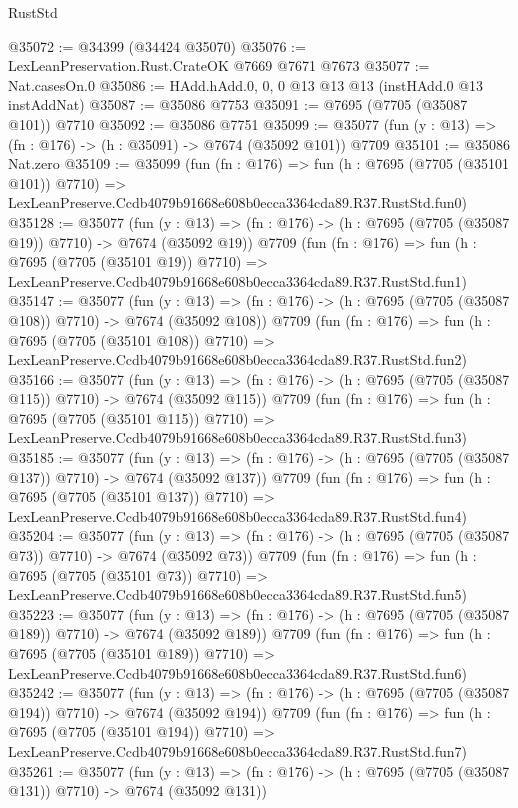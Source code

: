 \begin{lexlean}{RustStd}
\begin{coremodule}
@35072 := @34399 (@34424 @35070)
@35076 := LexLeanPreservation.Rust.CrateOK @7669 @7671 @7673
@35077 := Nat.casesOn.{0}
@35086 := HAdd.hAdd.{0, 0, 0} @13 @13 @13 (instHAdd.{0} @13 instAddNat)
@35087 := @35086 @7753
@35091 := @7695 (@7705 (@35087 @101)) @7710
@35092 := @35086 @7751
@35099 := @35077 (fun (y : @13) => (fn : @176) -> (h : @35091) -> @7674 (@35092 @101)) @7709
@35101 := @35086 Nat.zero
@35109 := @35099
    (fun (fn : @176) =>
    fun (h : @7695 (@7705 (@35101 @101)) @7710) =>
    LexLeanPreserve.Ccdb4079b91668e608b0ecca3364cda89.R37.RustStd.fun0)
@35128 := @35077
    (fun (y : @13) => (fn : @176) -> (h : @7695 (@7705 (@35087 @19)) @7710) -> @7674 (@35092 @19))
    @7709
    (fun (fn : @176) =>
    fun (h : @7695 (@7705 (@35101 @19)) @7710) =>
    LexLeanPreserve.Ccdb4079b91668e608b0ecca3364cda89.R37.RustStd.fun1)
@35147 := @35077
    (fun (y : @13) => (fn : @176) -> (h : @7695 (@7705 (@35087 @108)) @7710) -> @7674 (@35092 @108))
    @7709
    (fun (fn : @176) =>
    fun (h : @7695 (@7705 (@35101 @108)) @7710) =>
    LexLeanPreserve.Ccdb4079b91668e608b0ecca3364cda89.R37.RustStd.fun2)
@35166 := @35077
    (fun (y : @13) => (fn : @176) -> (h : @7695 (@7705 (@35087 @115)) @7710) -> @7674 (@35092 @115))
    @7709
    (fun (fn : @176) =>
    fun (h : @7695 (@7705 (@35101 @115)) @7710) =>
    LexLeanPreserve.Ccdb4079b91668e608b0ecca3364cda89.R37.RustStd.fun3)
@35185 := @35077
    (fun (y : @13) => (fn : @176) -> (h : @7695 (@7705 (@35087 @137)) @7710) -> @7674 (@35092 @137))
    @7709
    (fun (fn : @176) =>
    fun (h : @7695 (@7705 (@35101 @137)) @7710) =>
    LexLeanPreserve.Ccdb4079b91668e608b0ecca3364cda89.R37.RustStd.fun4)
@35204 := @35077
    (fun (y : @13) => (fn : @176) -> (h : @7695 (@7705 (@35087 @73)) @7710) -> @7674 (@35092 @73))
    @7709
    (fun (fn : @176) =>
    fun (h : @7695 (@7705 (@35101 @73)) @7710) =>
    LexLeanPreserve.Ccdb4079b91668e608b0ecca3364cda89.R37.RustStd.fun5)
@35223 := @35077
    (fun (y : @13) => (fn : @176) -> (h : @7695 (@7705 (@35087 @189)) @7710) -> @7674 (@35092 @189))
    @7709
    (fun (fn : @176) =>
    fun (h : @7695 (@7705 (@35101 @189)) @7710) =>
    LexLeanPreserve.Ccdb4079b91668e608b0ecca3364cda89.R37.RustStd.fun6)
@35242 := @35077
    (fun (y : @13) => (fn : @176) -> (h : @7695 (@7705 (@35087 @194)) @7710) -> @7674 (@35092 @194))
    @7709
    (fun (fn : @176) =>
    fun (h : @7695 (@7705 (@35101 @194)) @7710) =>
    LexLeanPreserve.Ccdb4079b91668e608b0ecca3364cda89.R37.RustStd.fun7)
@35261 := @35077
    (fun (y : @13) => (fn : @176) -> (h : @7695 (@7705 (@35087 @131)) @7710) -> @7674 (@35092 @131))

\end{coremodule}
\end{lexlean}
